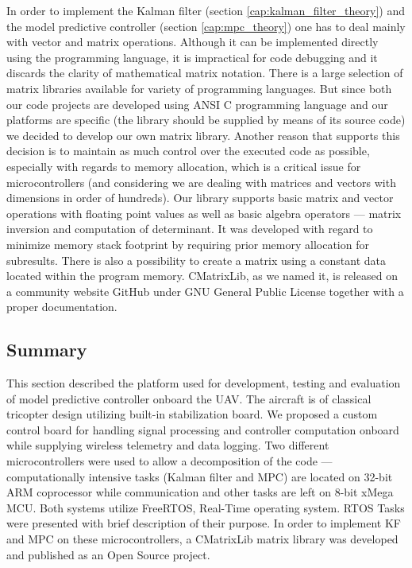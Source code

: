 In order to implement the Kalman filter (section \ref{cap:kalman_filter_theory}) and the model predictive controller (section \ref{cap:mpc_theory}) one has to deal mainly with vector and matrix operations. Although it can be implemented directly using the programming language, it is impractical for code debugging and it discards the clarity of mathematical matrix notation. There is a large selection of matrix libraries \citep{matrixlibraries} available for variety of programming languages. But since both our code projects are developed using ANSI C programming language and our platforms are specific (the library should be supplied by means of its source code) we decided to develop our own matrix library. Another reason that supports this decision is to maintain as much control over the executed code as possible, especially with regards to memory allocation, which is a critical issue for microcontrollers (and considering we are dealing with matrices and vectors with dimensions in order of hundreds). Our library supports basic matrix and vector operations with floating point values as well as basic algebra operators --- matrix inversion and computation of determinant. It was developed with regard to minimize memory stack footprint by requiring prior memory allocation for subresults. There is also a possibility to create a matrix using a constant data located within the program memory. CMatrixLib, as we named it, is released on a community website GitHub \citep{cmatrixlib} under GNU General Public License together with a proper documentation.

\subsection{Summary}

This section described the platform used for development, testing and evaluation of model predictive controller onboard the UAV. The aircraft is of classical tricopter design utilizing built-in stabilization board. We proposed a custom control board for handling signal processing and controller computation onboard while supplying wireless telemetry and data logging. Two different microcontrollers were used to allow a decomposition of the code --- computationally intensive tasks (Kalman filter and MPC) are located on 32-bit ARM coprocessor while communication and other tasks are left on 8-bit xMega MCU. Both systems utilize FreeRTOS, Real-Time operating system. RTOS Tasks were presented with brief description of their purpose. In order to implement KF and MPC on these microcontrollers, a CMatrixLib matrix library was developed and published as an Open Source project. 